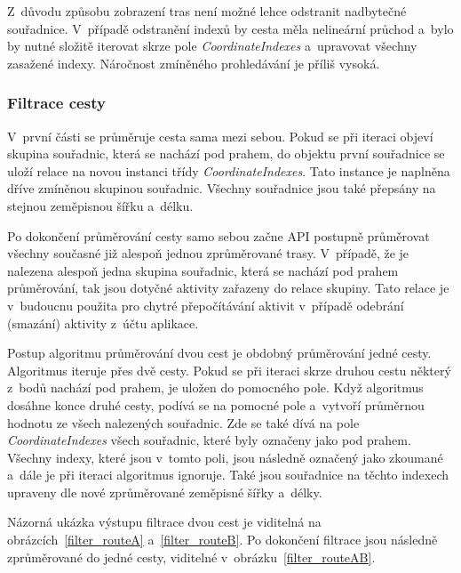 Z~důvodu způsobu zobrazení tras není možné lehce odstranit nadbytečné souřadnice. V~případě odstranění indexů by cesta měla nelineární průchod a~bylo by nutné složitě iterovat skrze pole \emph{CoordinateIndexes} a~upravovat všechny zasažené indexy. Náročnost zmíněného prohledávání je příliš vysoká.

\subsubsection{Filtrace cesty}
V~první části se průměruje cesta sama mezi sebou. Pokud se při iteraci objeví skupina souřadnic, která se nachází pod prahem, do objektu první souřadnice se uloží relace na novou instanci třídy \emph{CoordinateIndexes}. Tato instance je naplněna dříve zmíněnou skupinou souřadnic. Všechny souřadnice jsou také přepsány na stejnou zeměpisnou šířku a~délku. 

Po dokončení průměrování cesty samo sebou začne API postupně průměrovat všechny současné již alespoň jednou zprůměrované trasy. V~případě, že je nalezena alespoň jedna skupina souřadnic, která se nachází pod prahem průměrování, tak jsou dotyčné aktivity zařazeny do relace skupiny. Tato relace je v~budoucnu použita pro chytré přepočítávání aktivit v~případě odebrání (smazání) aktivity z~účtu aplikace. 

Postup algoritmu průměrování dvou cest je obdobný průměrování jedné cesty. Algoritmus iteruje přes dvě cesty. Pokud se při iteraci skrze druhou cestu některý z~bodů nachází pod prahem, je uložen do pomocného pole. Když algoritmus dosáhne konce druhé cesty, podívá se na pomocné pole a~vytvoří průměrnou hodnotu ze všech nalezených souřadnic. Zde se také dívá na pole \emph{CoordinateIndexes} všech souřadnic, které byly označeny jako pod prahem. Všechny indexy, které jsou v~tomto poli, jsou následně označený jako zkoumané a~dále je při iteraci algoritmus ignoruje. Také jsou souřadnice na těchto indexech upraveny dle nové zprůměrované zeměpisné šířky a~délky. 

Názorná ukázka výstupu filtrace dvou cest je viditelná na obrázcích~\ref{filter_routeA} a~\ref{filter_routeB}. Po dokončení filtrace jsou následně zprůměrované do jedné cesty, viditelné v~obrázku~\ref{filter_routeAB}.
\newpage
